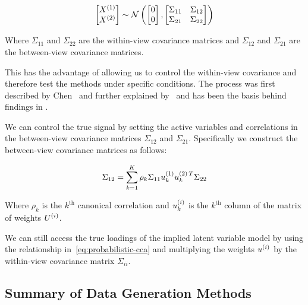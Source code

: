 \begin{align}
    \label{eq:covariance}
    \begin{bmatrix}
        X^{(1)} \\ X^{(2)}
    \end{bmatrix} \sim \mathcal{N} \left( \begin{bmatrix}
                                              0 \\ 0
    \end{bmatrix}, \begin{bmatrix}
                       \Sigma_{11} & \Sigma_{12} \\ \Sigma_{21} & \Sigma_{22}
    \end{bmatrix} \right)
\end{align}

Where $\Sigma_{11}$ and $\Sigma_{22}$ are the within-view covariance matrices and $\Sigma_{12}$ and $\Sigma_{21}$ are the between-view covariance matrices.

This has the advantage of allowing us to control the within-view covariance and therefore test the methods under specific conditions.
The process was first described by Chen~\citep{chen2013sparse} and further explained by~\citep{suo2017sparse} and has been the basis behind findings in \citet{helmer2020stability,matkovivc2023static}.

We can control the true signal by setting the active variables and correlations in the between-view covariance matrices $\Sigma_{12}$ and $\Sigma_{21}$.
Specifically we construct the between-view covariance matrices as follows:

\begin{align}
    \Sigma_{12}=\sum_{k=1}^{K}\rho_k\Sigma_{11}u^{(1)}_{k}u^{(2)\,T}_k\Sigma_{22}
\end{align}

Where $\rho_k$ is the $k^{\text{th}}$ canonical correlation and $u^{(i)}_k$ is the $k^{\text{th}}$ column of the matrix of weights $U^{(i)}$.

We can still access the true \gls{loadings} of the implied latent variable model by using the relationship in~\ref{eq:probabilistic-cca} and multiplying the weights $u^{(i)}$ by the within-view covariance matrix $\Sigma_{ii}$.

\subsection{Summary of Data Generation Methods}

